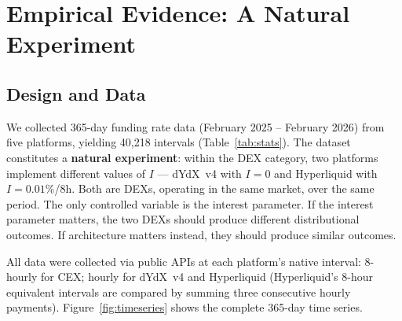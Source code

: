 \documentclass[10pt,twocolumn]{article}
\begin{document}
\section{Empirical Evidence: A Natural Experiment}
\label{sec:empirical}

\subsection{Design and Data}

We collected 365-day funding rate data (February 2025 -- February 2026) from
five platforms, yielding 40,218 intervals (Table~\ref{tab:stats}). The dataset
constitutes a \textbf{natural experiment}: within the DEX category, two
platforms implement different values of $I$ --- dYdX~v4 with $I=0$ and
Hyperliquid with $I=0.01\%$/8h. Both are DEXs, operating in the same market,
over the same period. The only controlled variable is the interest parameter.
If the interest parameter matters, the two DEXs should produce different
distributional outcomes. If architecture matters instead, they should produce
similar outcomes.

All data were collected via public APIs at each platform's native interval:
8-hourly for CEX; hourly for dYdX~v4 and Hyperliquid (Hyperliquid's 8-hour
equivalent intervals are compared by summing three consecutive hourly payments).
Figure~\ref{fig:timeseries} shows the complete 365-day time series.
\end{document}
